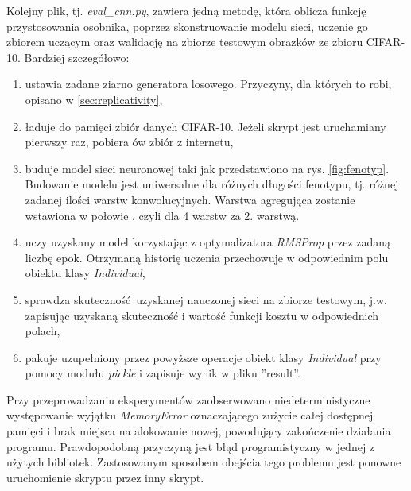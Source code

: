 Kolejny plik, tj. \textit{eval\_cnn.py}, zawiera jedną metodę, która oblicza funkcję przystosowania osobnika, poprzez skonstruowanie modelu sieci, uczenie go zbiorem uczącym oraz walidację na zbiorze testowym obrazków ze zbioru CIFAR-10.
Bardziej szczegółowo:
\begin{enumerate}
  \item ustawia zadane ziarno generatora losowego. Przyczyny, dla których to robi, opisano w \ref{sec:replicativity},
  \item ładuje do pamięci zbiór danych CIFAR-10. Jeżeli skrypt jest uruchamiany pierwszy raz, pobiera ów zbiór z internetu,
  \item buduje model sieci neuronowej taki jak przedstawiono na rys. \ref{fig:fenotyp}.
        Budowanie modelu jest uniwersalne dla różnych długości fenotypu, tj. różnej zadanej ilości warstw konwolucyjnych.
        Warstwa agregująca zostanie wstawiona w połowie , czyli dla 4 warstw za 2. warstwą.
  \item uczy uzyskany model korzystając z optymalizatora \textit{RMSProp} przez zadaną liczbę epok. Otrzymaną historię uczenia przechowuje w odpowiednim polu obiektu klasy \textit{Individual},\label{list:training}
  \item sprawdza skuteczność uzyskanej nauczonej sieci na zbiorze testowym, j.w. zapisując uzyskaną skuteczność i wartość funkcji kosztu w odpowiednich polach,\label{list:check}
  \item pakuje uzupełniony przez powyższe operacje obiekt klasy \textit{Individual} przy pomocy modułu \textit{pickle} i zapisuje wynik w pliku ''result''.
\end{enumerate}

Przy przeprowadzaniu eksperymentów zaobserwowano niedeterministyczne występowanie wyjątku \textit{MemoryError} oznaczającego zużycie całej dostępnej pamięci i brak miejsca na alokowanie nowej, powodujący zakończenie działania programu.
Prawdopodobną przyczyną jest błąd programistyczny w jednej z użytych bibliotek.
Zastosowanym sposobem obejścia tego problemu jest ponowne uruchomienie skryptu przez inny skrypt.

